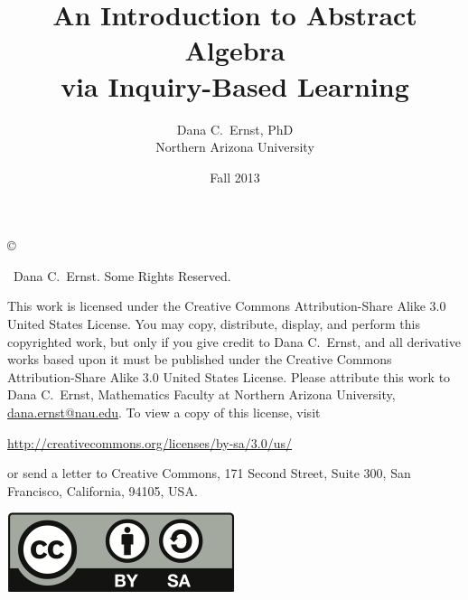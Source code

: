 \documentclass[12pt,oneside]{book}
\begin{document}
\title{An Introduction to Abstract Algebra\\
via Inquiry-Based Learning}
\author{Dana C.~Ernst, PhD\\
Northern Arizona University}
\date{Fall 2013}
\maketitle

\thispagestyle{empty}
\noindent\copyright{ \the\year\ Dana C.~Ernst.  Some Rights Reserved.\\

\bigskip

\noindent This work is licensed under the Creative Commons Attribution-Share Alike 3.0 United States License.  You may copy, distribute, display, and perform this copyrighted work, but only if you give credit to Dana C.~Ernst, and all derivative works based upon it must be published under the Creative Commons Attribution-Share Alike 3.0 United States License. Please attribute this work to Dana C.~Ernst, Mathematics Faculty at Northern Arizona University, \url{dana.ernst@nau.edu}. To view a copy of this license, visit
\begin{center}
\url{http://creativecommons.org/licenses/by-sa/3.0/us/}
\end{center}
or send a letter to Creative Commons, 171 Second Street, Suite 300, San Francisco, California, 94105, USA.}

\bigskip

\begin{center}
\includegraphics{by-sa.png}
\end{center}

\tableofcontents








\end{document}
